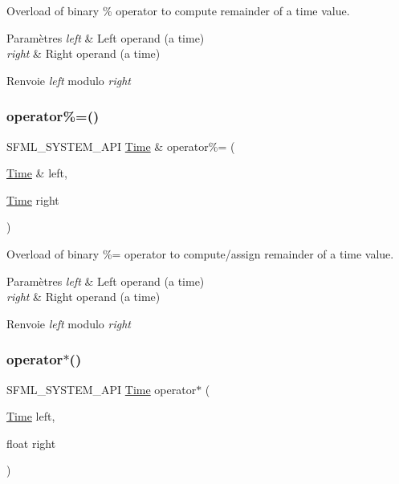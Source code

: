 Overload of binary \% operator to compute remainder of a time value. 


\begin{DoxyParams}{Paramètres}
{\em left} & Left operand (a time) \\
\hline
{\em right} & Right operand (a time)\\
\hline
\end{DoxyParams}
\begin{DoxyReturn}{Renvoie}
{\itshape left} modulo {\itshape right} 
\end{DoxyReturn}
\mbox{\label{classsf_1_1Time_af12dd271f14a17b58c9d737395e776d4}} 
\subsubsection{\texorpdfstring{operator\%=()}{operator\%=()}}
{\footnotesize\ttfamily S\+F\+M\+L\+\_\+\+S\+Y\+S\+T\+E\+M\+\_\+\+A\+PI \hyperlink{classsf_1_1Time}{Time} \& operator\%= (\begin{DoxyParamCaption}\item[{\hyperlink{classsf_1_1Time}{Time} \&}]{left,  }\item[{\hyperlink{classsf_1_1Time}{Time}}]{right }\end{DoxyParamCaption})\hspace{0.3cm}{\ttfamily [related]}}



Overload of binary \%= operator to compute/assign remainder of a time value. 


\begin{DoxyParams}{Paramètres}
{\em left} & Left operand (a time) \\
\hline
{\em right} & Right operand (a time)\\
\hline
\end{DoxyParams}
\begin{DoxyReturn}{Renvoie}
{\itshape left} modulo {\itshape right} 
\end{DoxyReturn}
\mbox{\label{classsf_1_1Time_ac1386c6360872d354b9b59eadcd9778d}} 
\subsubsection{\texorpdfstring{operator$\ast$()}{operator*()}\hspace{0.1cm}{\footnotesize\ttfamily [1/4]}}
{\footnotesize\ttfamily S\+F\+M\+L\+\_\+\+S\+Y\+S\+T\+E\+M\+\_\+\+A\+PI \hyperlink{classsf_1_1Time}{Time} operator$\ast$ (\begin{DoxyParamCaption}\item[{\hyperlink{classsf_1_1Time}{Time}}]{left,  }\item[{float}]{right }\end{DoxyParamCaption})\hspace{0.3cm}{\ttfamily [related]}}



